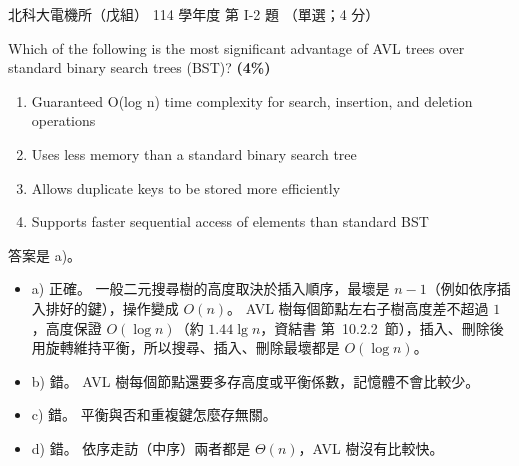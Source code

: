 \begin{pastexam}[label={px:ntut-114-ee-ds-02}]{北科大電機所（戊組） 114 學年度 第 I-2 題}
（單選；4 分）

Which of the following is the most significant advantage of AVL trees over standard binary search trees
(BST)? \textbf{(4\%)}
\begin{enumerate}[label=\alph*)]
\item Guaranteed O(log n) time complexity for search, insertion, and deletion operations
\item Uses less memory than a standard binary search tree
\item Allows duplicate keys to be stored more efficiently
\item Supports faster sequential access of elements than standard BST
\end{enumerate}
\end{pastexam}

\begin{pastsoln}
答案是 a)。

\begin{itemize}
\item a) 正確。 一般二元搜尋樹的高度取決於插入順序，最壞是 $n - 1$（例如依序插入排好的鍵），操作變成
$O(n)$。 AVL 樹每個節點左右子樹高度差不超過 $1$，高度保證 $O(\log n)$（約 $1.44 \lg n$，資結書
第~10.2.2~節），插入、刪除後用旋轉維持平衡，所以搜尋、插入、刪除最壞都是 $O(\log n)$。
\item b) 錯。 AVL 樹每個節點還要多存高度或平衡係數，記憶體不會比較少。
\item c) 錯。 平衡與否和重複鍵怎麼存無關。
\item d) 錯。 依序走訪（中序）兩者都是 $\Theta(n)$，AVL 樹沒有比較快。
\end{itemize}
\end{pastsoln}
